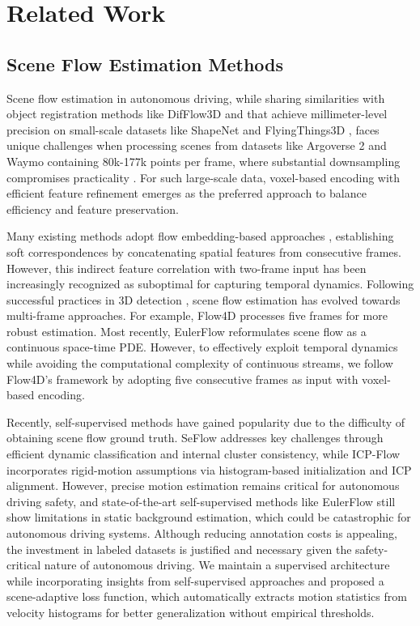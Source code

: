\section{Related Work}
\subsection{Scene Flow Estimation Methods}
Scene flow estimation in autonomous driving, while sharing similarities with object registration methods like DifFlow3D \cite{liu2024difflow3d} and \cite{wang20233d} that achieve millimeter-level precision on small-scale datasets like ShapeNet \cite{Chang_Funkhouser_Guibas_Hanrahan_Huang_Li_Savarese_Savva_Song_Su_etal._2015} and FlyingThings3D \cite{mayer2016large}, faces unique challenges when processing scenes from datasets like Argoverse 2 \cite{argoverse2} and Waymo \cite{waymo} containing 80k-177k points per frame, where substantial downsampling compromises practicality \cite{Jund_Sweeney_Abdo_Chen_Shlens_2022}. For such large-scale data, voxel-based encoding with efficient feature refinement emerges as the preferred approach to balance efficiency and feature preservation.

Many existing methods adopt flow embedding-based approaches \cite{liu2019flownet3d,zhang2024deflow,Jund_Sweeney_Abdo_Chen_Shlens_2022,lin2024icp}, establishing soft correspondences by concatenating spatial features from consecutive frames. However, this indirect feature correlation with two-frame input has been increasingly recognized as suboptimal for capturing temporal dynamics. Following successful practices in 3D detection \cite{vedder2022sparse}, scene flow estimation has evolved towards multi-frame approaches. For example, Flow4D \cite{kim2024flow4d} processes five frames for more robust estimation. Most recently, EulerFlow \cite{vedder2024scene} reformulates scene flow as a continuous space-time PDE. However, to effectively exploit temporal dynamics while avoiding the computational complexity of continuous streams, we follow Flow4D's framework by adopting five consecutive frames as input with voxel-based encoding.

Recently, self-supervised methods have gained popularity due to the difficulty of obtaining scene flow ground truth. SeFlow \cite{zhang2024seflow} addresses key challenges through efficient dynamic classification and internal cluster consistency, while ICP-Flow \cite{lin2024icp} incorporates rigid-motion assumptions via histogram-based initialization and ICP alignment. However, precise motion estimation remains critical for autonomous driving safety, and state-of-the-art self-supervised methods like EulerFlow still show limitations in static background estimation, which could be catastrophic for autonomous driving systems. Although reducing annotation costs is appealing, the investment in labeled datasets is justified and necessary given the safety-critical nature of autonomous driving. We maintain a supervised architecture while incorporating insights from self-supervised approaches and proposed a scene-adaptive loss function, which automatically extracts motion statistics from velocity histograms for better generalization without empirical thresholds.

